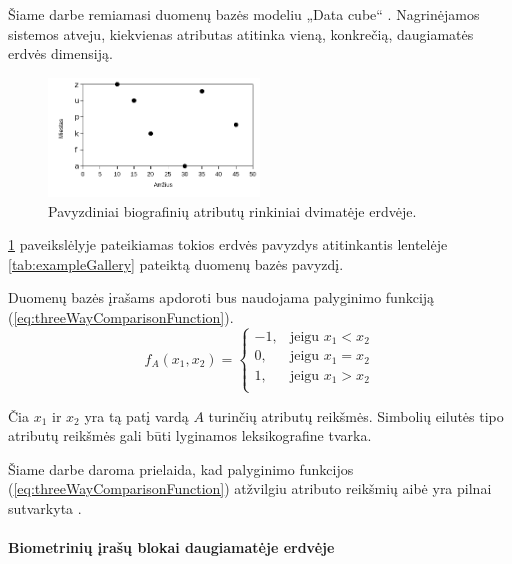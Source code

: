Šiame darbe remiamasi duomenų bazės modeliu „Data cube“ \cite{marcel2000modeling}.
Nagrinėjamos sistemos atveju, kiekvienas atributas atitinka vieną, konkrečią, daugiamatės erdvės dimensiją.

\begin{figure}[H]
\begin{center}
\includegraphics[width=0.5\textwidth]{img/MultidimensionalGallery.png}
\caption{Pavyzdiniai biografinių atributų rinkiniai dvimatėje erdvėje.}
\label{img:multidimensionalGallery}
\end{center}
\end{figure}

\ref{img:multidimensionalGallery} paveikslėlyje pateikiamas tokios erdvės pavyzdys atitinkantis lentelėje \ref{tab:exampleGallery} pateiktą duomenų bazės pavyzdį.

Duomenų bazės įrašams apdoroti bus naudojama palyginimo funkciją (\ref{eq:threeWayComparisonFunction}).
\begin{equation}
	f_A(x_1, x_2)=
\begin{cases}
	-1,& \text{jeigu } x_1 < x_2\\
	0,& \text{jeigu } x_1 = x_2\\
	1,& \text{jeigu } x_1 > x_2\\
\end{cases}
\label{eq:threeWayComparisonFunction}
\end{equation}

Čia $x_1$ ir $x_2$ yra tą patį vardą $A$ turinčių atributų reikšmės.
Simbolių eilutės tipo atributų reikšmės gali būti lyginamos leksikografine tvarka.

Šiame darbe daroma prielaida, kad palyginimo funkcijos (\ref{eq:threeWayComparisonFunction}) atžvilgiu atributo reikšmių aibė yra pilnai sutvarkyta \cite{hrbacek1999introduction}.




\paragraph{Biometrinių įrašų blokai daugiamatėje erdvėje}

